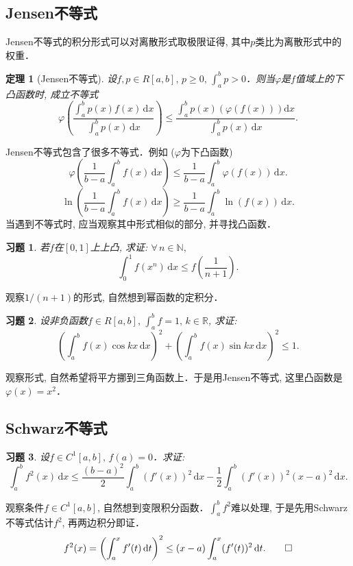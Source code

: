 \documentclass[11pt,a4paper]{ctexart}
\makeatletter
\theoremstyle{thmseries} %
\newtheorem{thm}{定理}[section]
\theoremstyle{exerseries}
\newtheorem{exer}{习题}[section]
\renewenvironment{proof}[1][\proofname]{\par
  \pushQED{\qed}%
  \normalfont \topsep6\p@\@plus6\p@\relax
  \trivlist
  \item[\hskip\labelsep
        \itshape
    #1\@addpunct{}]\ignorespaces
}{%
  \popQED\endtrivlist\@endpefalse
}
\newenvironment{pf}{\begin{proof}[\bfseries\upshape 证\quad]}{\end{proof}}
\newcommand{\bra}[1]{\mathopen{}\left(#1\right)}
\renewcommand{\phi}{\varphi}
\newcommand{\R}{\mathbb{R}}
\newcommand{\N}{\mathbb{N}}
\renewcommand{\d}{\mathrm{d}}
\makeatother
\begin{document}
\subsection{Jensen不等式}
Jensen不等式的积分形式可以对离散形式取极限证得, 其中$p$类比为离散形式中的权重．
\begin{thm}[Jensen不等式]
	设$f,p\in R[a,b],\,p\geq0,\,\int_{a}^{b}p>0$．则当$\phi$是$f$值域上的下凸函数时, 成立不等式
	\[\phi\bra{\frac{\int_{a}^{b}p(x)f(x)\,\d x}{\int_{a}^{b}p(x)\,\d x}}\leq\frac{\int_{a}^{b}p(x)\bra{\phi(f(x))}\d x}{\int_{a}^{b}p(x)\,\d x}.\]
\end{thm}

Jensen不等式包含了很多不等式．例如 ($\phi$为下凸函数)
\[\phi\bra{\frac{1}{b-a}\int_{a}^{b}f(x)\,\d x}\leq\frac{1}{b-a}\int_{a}^{b}\phi(f(x))\,\d x.\]
\[\ln\bra{\frac{1}{b-a}\int_{a}^{b}f(x)\,\d x}\geq\frac{1}{b-a}\int_{a}^{b}\ln(f(x))\,\d x.\]
当遇到不等式时, 应当观察其中形式相似的部分, 并寻找凸函数．

\begin{exer}
	若$f$在$[0,1]$上上凸, 求证: $\forall\,n\in\N,$
	\[\int_{0}^{1}f(x^n)\,\d x\leq f\bra{\frac{1}{n+1}}.\]
\end{exer}
\begin{pf}
	观察$1/(n+1)$的形式, 自然想到幂函数的定积分．
\end{pf}

\begin{exer}
	设非负函数$f\in R[a,b],\,\int_{a}^{b}f=1,\,k\in\R$, 求证:
	\[\bra{\int_{a}^{b}f(x)\cos kx\,\d x}^2+\bra{\int_{a}^{b}f(x)\sin kx\,\d x}^2\leq1.\]
\end{exer}
\begin{pf}
	观察形式, 自然希望将平方挪到三角函数上．于是用Jensen不等式, 这里凸函数是$\phi(x)=x^2$．
\end{pf}

\subsection{Schwarz不等式}
\begin{exer}
	设$f\in C^1[a,b],\,f(a)=0$．求证:
	\[\int_{a}^{b}f^2(x)\,\d x\leq\frac{(b-a)^2}{2}\int_{a}^{b}(f'(x))^2\,\d x-\frac{1}{2}\int_{a}^{b}(f'(x))^2(x-a)^2\,\d x.\]
\end{exer}
\begin{pf}
	观察条件$f\in C^1[a,b]$, 自然想到变限积分函数．$\int_{a}^{b} f^2$难以处理, 于是先用Schwarz不等式估计$f^2$, 再两边积分即证．
	\[f^2(x)=\bra{\int_{a}^{x}f'(t)\,\d t}^2\leq(x-a)\int_{a}^{x}(f'(t))^2\,\d t.\qedhere\]
\end{pf}
\end{document}
